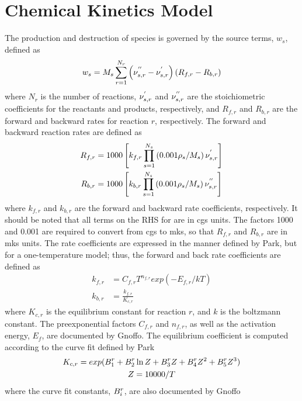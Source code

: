 \section{Chemical Kinetics Model}

The production and destruction of species is governed by the source terms,
$w_s$, defined as
\begin{equation}
  w_s = M_s \sum_{r=1}^{N_r}\left( \nu_{s,r}^{''} - \nu_{s,r}^{'} \right)
        \left( R_{f,r} - R_{b,r} \right)
  \label{source-term}
\end{equation}
where $N_r$ is the number of reactions, $\nu_{s,r}^{'}$ and $\nu_{s,r}^{''}$ are the
stoichiometric coefficients for the reactants and products, respectively, and
$R_{f,r}$ and $R_{b,r}$ are the forward and backward rates for reaction
$r$, respectively.  The forward and backward reaction rates are defined as
\begin{align}
  R_{f,r} &= 1000\left[ k_{f,r}\prod_{s=1}^{N_s}\left( 0.001\rho_s/M_s
  \right)\nu_{s,r}^{'} \right] \label{forward-rate} \\
  R_{b,r} &= 1000\left[ k_{b,r}\prod_{s=1}^{N_s}\left( 0.001\rho_s/M_s
  \right)\nu_{s,r}^{''} \right]
  \label{backward-rate}
\end{align}
where $k_{f,r}$ and $k_{b,r}$ are the forward and backward rate coefficients,
respectively.  It should be noted that all terms on the RHS for
 are in cgs units.  The factors 1000 and 0.001 are required
to convert from cgs to mks, so that $R_{f,r}$ and $R_{b,r}$ are in mks units.
The rate coefficients are expressed in the manner defined by Park\cite{park},
but for a one-temperature model; thus, the forward and back rate coefficients
are defined as
\begin{align}
  k_{f,r} &= C_{f,r}T^{n_{f,r}}exp\left( -E_{f,r}/kT \right)
  \label{forward-rate-coef} \\
  k_{b,r} &= \frac{k_{f,r}}{K_{c,r}}
  \label{backward-rate-coef}
\end{align}
where $K_{c,r}$ is the equilibrium constant for reaction $r$, and $k$ is the
boltzmann constant.  The preexponential factors $C_{f,r}$ and $n_{f,r}$, as well
as the activation energy, $E_f$, are documented by Gnoffo\cite{gnoffo-tp}.
The equilibrium coefficient is computed according to the curve fit defined by
Park\cite{park1985convergence}
\begin{gather}
  K_{c,r} = exp(B_{1}^{r} + B_{2}^{r}\ln{Z} + B_{3}^{r}Z + B_{4}^{r}Z^2 + B_{5}^{r}Z^3) \\
  Z = 10000/T
\end{gather}
where the curve fit constants, $B_{i}^{r}$, are also documented by
Gnoffo\cite{gnoffo-tp}
